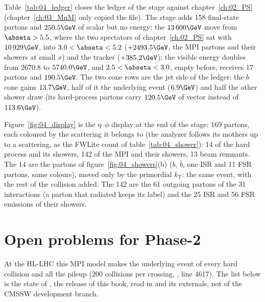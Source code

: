 Table~\ref{tab:04_ledger} closes the ledger of the stage against chapter~\ref{ch:02_PS}
(chapter~\ref{ch:03_MnM} only copied the file). The stage adds 158 final-state partons and $250.5\GeV$ of scalar
\pt{} but no energy: the $13\,600\GeV$ move from $\abseta>5.5$, where the two spectators of
chapter~\ref{ch:02_PS} sat with $10\,929\GeV$, into $3.0<\abseta<5.2$ ($+2493.5\GeV$, the MPI partons and their
showers at small $x$) and the tracker ($+385.2\GeV$); the visible energy doubles from 2670.8 to $5740.0\GeV$, and
$2.5<\abseta<3.0$, empty before, receives 17 partons and $190.5\GeV$. The two cone rows are the jet side of the
ledger: the $b$ cone gains $13.7\GeV$, half of it the underlying event ($6.9\GeV$) and half the other shower
draw (its hard-process partons carry $120.5\GeV$ of vector \pt{} instead of $113.6\GeV$).

Figure~\ref{fig:04_display} is the $\eta$--$\phi$ display at the end of the stage: 169 partons, each coloured
by the scattering it belongs to (the analyzer follows its mothers up to a scattering, as the FWLite count of
table~\ref{tab:04_shower}): 14 of the hard process and its showers, 142 of the MPI and their showers, 13 beam
remnants. The 14 are the partons of figure~\ref{fig:04_showers}(b) ($b$, $\bar b$, one ISR and 11 FSR partons,
same colours), moved only by the primordial $k_\mathrm{T}$: the same event, with the rest of the collision
added. The 142 are the 61 outgoing partons of the 31 interactions (a parton that radiated keeps its label) and
the 25 ISR and 56 FSR emissions of their showers.


\section{Open problems for Phase-2}

At the HL-LHC this MPI model makes the underlying event of every hard collision and all the pileup (200 collisions
per crossing, ,  line 4617). The list below is the state of
, the release of this book, read in  and its externals, not of
the CMSSW development branch.

